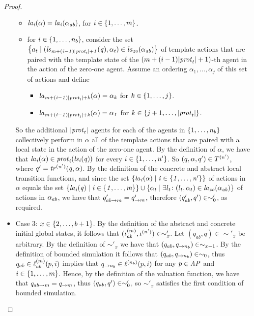 \documentclass{article}
\begin{document}
\begin{proof}
\begin{itemize}
  \begin{itemize}
      \item $\it{la}_{i}({\alpha}) = \it{la}_{i}({\alpha_{ab}})$, for $i \in \left \{ 1,\ldots,m \right \}$.
      \item  for $i \in \left \{ 1,\ldots,n_b \right \}$, consider the set $\left \{ a_t \mid (\it{ls}_{m + (i - 1)    |\mathit{prot}_{t}| + 1}(q),\alpha_t) \in \it{la}_{zo}({\alpha_{ab}}) \right \}$ of template actions
    that are paired with the template state of the $(m + (i-1)|\mathit{prot}_{t}| + 1)$-th agent
    in the action of the zero-one agent. Assume an ordering $\alpha_1, \ldots,
    \alpha_j$ of this set of  actions and define
    \begin{itemize}
        \item  $\it{la}_{m + (i -1) |\mathit{prot}_{t}| + k}({\alpha}) = \alpha_k$  for $k \in \left \{ 1,\ldots,j \right \}$.
    \item $\it{la}_{m + (i-1) |\mathit{prot}_{t}| + k}({\alpha}) = \alpha_1$ for $k \in
    \left \{ j+1, \ldots, |\mathit{prot}_{t}| \right \}$.
    \end{itemize}
  \end{itemize}

So the additional $|\mathit{prot}_{t}|$ agents for each of the agents in
        $\left \{ 1,\ldots,n_b \right \}$ collectively perform in $\alpha$ all of the template actions
        that are paired with a local state in the action of  the zero-one
        agent. By the definition of $\alpha$, we have that $\it{la}_{i}({\alpha}) \in \mathit{prot}_{i}(\it{ls}_{i}(q))$ for every $i \in \left \{ 1,\ldots,n' \right \}$. So $(q, \alpha, q') \in T^{(n')}$, where $q' = \it{tr}^{(n')} (q, \alpha)$. By the definition of the
  concrete and abstract local transition functions, and since the set
        $\left \{ \it{la}_{i}({\alpha}) \mid i \in \left \{ 1,\ldots,n' \right \} \right \}$ of actions in $\alpha$ equals the set
  $\left \{ \it{la}_{i}({q}) \mid i \in \left \{ 1,\ldots,m \right \} \right \} \cup \left \{ \alpha_t \mid \exists
  l_t \colon (l_t, \alpha_t) \in \it{la}_{zo}({\alpha_{ab}}) \right \}$ of actions in $\alpha_{ab}$,
  we have that $q'_{ab \rightarrow m} = q'_{\rightarrow m}$, therefore
  $(q_{ab}', q') \in \sim'_0$, as required. 


  \item Case 3: $x \in \left \{ 2, \ldots, b+1 \right \}$.  
 By the definition of the abstract and concrete initial
      global states, it follows that $(\iota^{({m})}_{ab}, \iota^{({n'})}) \in
        \sim'_x$. Let $(q_{ab}, q) \in \sim'_x$ be arbitrary. 
      By the definition of $\sim'_x$
  we have that $(q_{ab}, q_{\rightarrow n_b}) \in \sim_{x-1}$. By the definition
  of bounded simulation it follows that $(q_{ab}, q_{\rightarrow n_b}) \in
  \sim_0$, thus  $q_{ab} \in \ell^{(m)}_{ab}(p, i)$ implies that $q_{\rightarrow n_b} \in
        \ell^{(n_b)} (p, i)$ for any $p \in \it{AP}$ and $i \in \left \{ 1,\ldots,m \right \}$. Hence, by the
  definition of the valuation function, we have that $q_{ab \rightarrow m} =
  q_{\rightarrow m}$, thus $(q_{ab}, q') \in \sim'_0$, so $\sim'_{x}$
  satisfies the first condition of bounded simulation. 



\end{itemize}
\end{proof}
\end{document}
